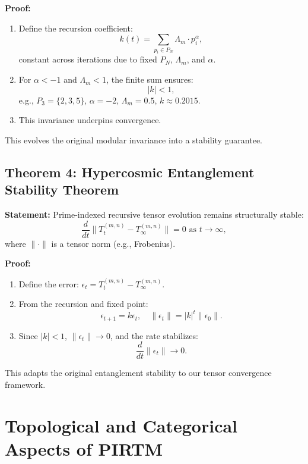 \documentclass{article}
\theoremstyle{plain}
\begin{document}
\textbf{Proof:}
\begin{enumerate}
    \item Define the recursion coefficient:
    \[
    k(t) = \sum_{p_i \in P_N} \Lambda_m \cdot p_i^\alpha,
    \]
    constant across iterations due to fixed \( P_N \), \( \Lambda_m \), and \( \alpha \).
    \item For \( \alpha < -1 \) and \( \Lambda_m < 1 \), the finite sum ensures:
    \[
    |k| < 1,
    \]
    e.g., \( P_3 = \{2, 3, 5\} \), \( \alpha = -2 \), \( \Lambda_m = 0.5 \), \( k \approx 0.2015 \).
    \item This invariance underpins convergence.
\end{enumerate}
This evolves the original modular invariance into a stability guarantee.

\subsection{Theorem 4: Hypercosmic Entanglement Stability Theorem}
\textbf{Statement:} Prime-indexed recursive tensor evolution remains structurally stable:
\begin{equation}
    \frac{d}{dt} \| T_t^{(m,n)} - T_\infty^{(m,n)} \| = 0 \text{ as } t \to \infty,
\end{equation}
where \( \| \cdot \| \) is a tensor norm (e.g., Frobenius).

\textbf{Proof:}
\begin{enumerate}
    \item Define the error: \( \epsilon_t = T_t^{(m,n)} - T_\infty^{(m,n)} \).
    \item From the recursion and fixed point:
    \[
    \epsilon_{t+1} = k \epsilon_t, \quad \|\epsilon_t\| = |k|^t \|\epsilon_0\|.
    \]
    \item Since \( |k| < 1 \), \( \|\epsilon_t\| \to 0 \), and the rate stabilizes:
    \[
    \frac{d}{dt} \|\epsilon_t\| \to 0.
    \]
\end{enumerate}
This adapts the original entanglement stability to our tensor convergence framework.
\section{Topological and Categorical Aspects of PIRTM}
\end{document}
